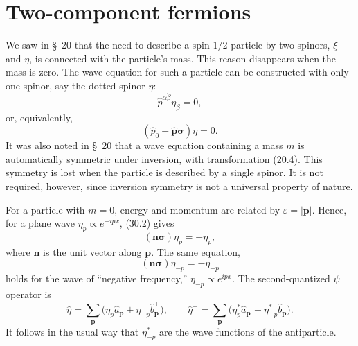 
\section{Two-component fermions}

We saw in \S~20 that the need to describe a spin-$1/2$ particle by two spinors, $\xi$ and $\eta$, is connected with the particle's mass. This reason disappears when the mass is zero. The wave equation for such a particle can be constructed with only one spinor, say the dotted spinor $\eta$:
\begin{equation}
\widehat p^{\alpha\dot\beta}\eta_{\dot\beta}=0,
\tag{30.1}
\end{equation}
or, equivalently,
\begin{equation}
(\widehat p_0+\widehat{\mathbf p}\boldsymbol\sigma)\eta=0.
\tag{30.2}
\end{equation}
It was also noted in \S~20 that a wave equation containing a mass $m$ is automatically symmetric under inversion, with transformation (20.4). This symmetry is lost when the particle is described by a single spinor. It is not required, however, since inversion symmetry is not a universal property of nature.

For a particle with $m=0$, energy and momentum are related by $\varepsilon=|\mathbf p|$. Hence, for a plane wave $\eta_p\propto e^{-ipx}$, (30.2) gives
\begin{equation}
(\mathbf n\boldsymbol\sigma)\eta_p=-\eta_p,
\tag{30.3}
\end{equation}
where $\mathbf n$ is the unit vector along $\mathbf p$. The same equation,
\begin{equation}
(\mathbf n\boldsymbol\sigma)\eta_{-p}=-\eta_{-p}
\tag{30.4}
\end{equation}
holds for the wave of ``negative frequency,'' $\eta_{-p}\propto e^{ipx}$. The second-quantized $\psi$ operator is
\begin{equation}
\widehat\eta=\sum_{\mathbf p}\bigl(\eta_p\widehat a_{\mathbf p}+\eta_{-p}\widehat b_{\mathbf p}^+\bigr),
\qquad
\widehat\eta^+=\sum_{\mathbf p}\bigl(\eta_p^*\widehat a_{\mathbf p}^++\eta_{-p}^*\widehat b_{\mathbf p}\bigr).
\tag{30.5}
\end{equation}
It follows in the usual way that $\eta_{-p}^*$ are the wave functions of the antiparticle.

